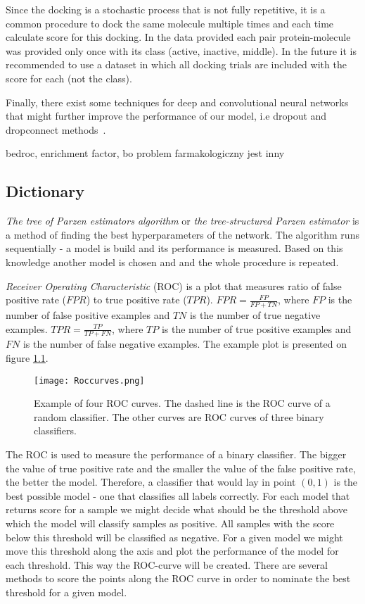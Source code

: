 \documentclass[a4paper,10pt]{report}
\begin{document}
      Since the docking is a stochastic process that is not fully repetitive, it is a common procedure to dock the same molecule multiple times and each time calculate score for this docking. In the data provided each pair protein-molecule was provided only once with its class (active, inactive, middle). In the future it is recommended to use a dataset in which all docking trials are included with the score for each (not the class).
      
      Finally, there exist some techniques for deep and convolutional neural networks that might further improve the performance of our model, i.e dropout and dropconnect methods~\cite{DUTCH}.
      
      bedroc, enrichment factor, bo problem farmakologiczny jest inny

   \begin{appendices}
    \chapter{Dictionary}\label{appendiks}
      \emph{The tree of Parzen estimators algorithm} or \emph{the tree-structured Parzen estimator} is a method of finding the best hyperparameters of the network. The algorithm runs sequentially - a model is build and its performance is measured. Based on this knowledge another model is chosen and and the whole procedure is repeated.
      
      
      \emph{Receiver Operating Characteristic} (ROC) is a plot that measures ratio of false positive rate ($FPR$) to true positive rate ($TPR$). $FPR = \frac{FP}{FP + TN}$, where $FP$ is the number of false positive examples and $TN$ is the number of true negative examples. $TPR = \frac{TP}{TP + FN}$, where $TP$ is the number of true positive examples and $FN$ is the number of false negative examples. The example plot is presented on figure \ref{fig:ROC}.
      
      \begin{figure}[h!]
	  \centering
	  \texttt{[image: Roccurves.png]}
	  \caption{Example of four ROC curves. The dashed line is the ROC curve of a random classifier. The other curves are ROC curves of three binary classifiers\cite{bibROC}.}
	  \label{fig:ROC}
      \end{figure} 
      
      The ROC is used to measure the performance of a binary classifier. The bigger the value of true positive rate and the smaller the value of the false positive rate, the better the model. Therefore, a classifier that would lay in point ${(0, 1)}$ is the best possible model - one that classifies all labels correctly. For each model that returns score for a sample we might decide  what should be the threshold above which the model will classify samples as positive. All samples with the score below this threshold will be classified as negative. For a given model we might move this threshold along the axis and plot the performance of the model for each threshold. This way the ROC-curve will be created. There are several methods to score the points along the ROC curve in order to nominate the best threshold for a given model.
      

\end{appendices}
\end{document}
